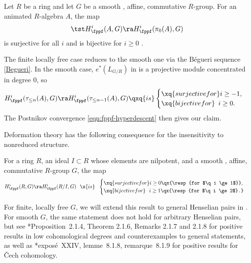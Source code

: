 \bcor \label{cor:nil-nil-deform-cohomology}
Let $R$ be a ring and let $G$ be a smooth , affine, commutative $R$-group. For an animated $R$-algebra $A$, the map
\[
\tst H^i_\fppf(A,G) \ra H^i_\fppf(\pi_0(A),G)
\]
is surjective for all $i$ and is bijective for $i\ge 0$ .
\ecor

\bpf
The finite locally free case reduces to the smooth one via the B\'{e}gueri sequence \eqref{Begueri}. In the smooth case, $e^*(L_{G/R})$ in  is a projective module concentrated in degree $0$, so %
\[
H^i_\fppf(\tau_{\le n}(A), G) \ra H^i_\fppf(\tau_{\le n - 1}(A), G) \qxq{is} \begin{cases} \xq{surjective for} i \ge -1, \\ \xq{bijective for} \, \, \, i \ge 0. \end{cases}
\]
The Postnikov convergence \eqref{eqn:fppf-hyperdescent} then gives our claim.
\epf



Deformation theory has the following consequence for the insensitivity to nonreduced structure.

\bcor \label{no-nil-feelings}
For a ring $R$, an ideal $I \subset R$ whose elements are nilpotent, and a smooth , affine, commutative $R$-group $G$, the map
\[
H^i_\fppf(R, G) \ra H^i_\fppf(R/I, G) \ \ \x{is}\ \ \begin{cases} \xq{surjective for} i\ge 0 \qx{\resp{for $\q i \ge 1$}}, \\   \xq{bijective for} \ \  i\ge 1 \qx{\resp{for $\q i \ge 2$}.} \end{cases}
\]
\ecor


For finite, locally free $G$, we will extend this result to general Henselian pairs in . For smooth $G$, the same statement does not hold for arbitrary Henselian pairs, but see \cite{BC19}*{Proposition~2.1.4, Theorem 2.1.6, Remarks 2.1.7 and 2.1.8} for positive results in low cohomological degrees and counterexamples to general statements, as well as \cite{SGA3IIInew}*{expos\'{e}~XXIV, lemme~8.1.8, remarque~8.1.9} for positive results for \v{C}ech cohomology.

